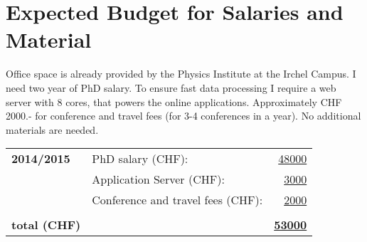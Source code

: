 \documentclass[12pt]{article}
\begin{document}
\newpage

\section*{Expected Budget for Salaries and Material}

Office space is already provided by the Physics Institute at the Irchel Campus.
I need two year of PhD salary.
To ensure fast data processing I require a web server with 8 cores, that powers the online applications.
Approximately CHF 2000.- for conference and travel fees (for 3-4 conferences in a year).
No additional materials are needed.

\vspace{1cm}

\begin{tabular}{llr}

 {\bf 2014/2015} & PhD salary (CHF): & \underline{48000} \\
            & Application Server (CHF): & \underline{3000} \\
            & Conference and travel fees (CHF): & \underline{2000} \\
            & & \\
 {\bf total (CHF)} &   & {\bf \underline{53000}}
\end{tabular}
\end{document}
